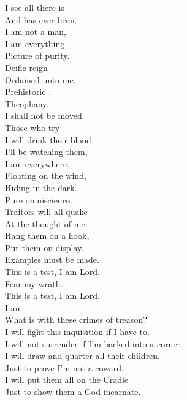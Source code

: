 



I see all there is \\
And has ever been. \\
I am not a man, \\
I am everything. \\
Picture of purity. \\

Deific reign \\
Ordained unto me. \\
Prehistoric . \\
Theophany. \\
I shall not be moved. \\
Those who try \\
I will drink their blood. \\

I'll be watching them, \\
I am everywhere. \\
Floating on the wind, \\
Hiding in the dark. \\
Pure omniscience. \\
Traitors will all quake \\
At the thought of me. \\
Hang them on a hook, \\
Put them on display. \\
Examples must be made. \\

This is a test, I am Lord. \\
Fear my wrath. \\
This is a test, I am Lord. \\
I am . \\

What is with these crimes of treason? \\
I will fight this inquisition if I have to. \\
I will not surrender if I'm backed into a corner. \\
I will draw and quarter all their children. \\
Just to prove I'm not a coward. \\
I will put them all on the  Cradle \\
Just to show them a God incarnate. \\

